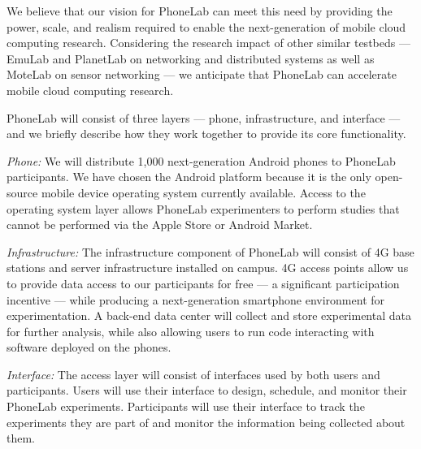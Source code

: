 \documentclass[12pt]{article}
\begin{document}
We believe that our vision for PhoneLab can meet this need by providing the
power, scale, and realism required to enable the next-generation of mobile
cloud computing research. Considering the research impact of other similar
testbeds --- EmuLab and PlanetLab on networking and distributed systems as
well as MoteLab on sensor networking --- we anticipate that PhoneLab can
accelerate mobile cloud computing research.

PhoneLab will consist of three layers --- phone, infrastructure, and
interface --- and we briefly describe how they work together to provide its
core functionality.

\emph{Phone:} We will distribute 1,000 next-generation Android
phones to PhoneLab participants. We have chosen the Android platform
because it is the only open-source mobile device operating system
currently available.  Access to the operating system layer allows
PhoneLab experimenters to perform studies that cannot be performed via
the Apple Store or Android Market.

\emph{Infrastructure:} The infrastructure component of
PhoneLab will consist of 4G base stations and server infrastructure installed
on campus. 4G access points allow us to provide data access to our
participants for free --- a significant participation incentive --- while
producing a next-generation smartphone environment for experimentation. A
back-end data center will collect and store experimental data for further
analysis, while also allowing users to run code interacting with software
deployed on the phones.

\emph{Interface:} The access layer will consist of interfaces used
by both users and participants. Users will use their interface to design,
schedule, and monitor their PhoneLab experiments. Participants will use
their interface to track the experiments they are part of and monitor the
information being collected about them.

%
%
\end{document}
